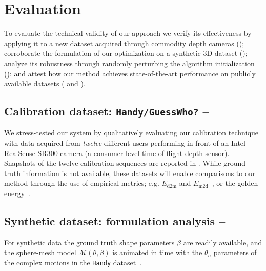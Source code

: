 \section{Evaluation}
To evaluate the technical validity of our approach we verify its effectiveness by applying it to a new dataset acquired through commodity depth cameras (); corroborate the formulation of our optimization on a synthetic 3D dataset (); analyze its robustness through randomly perturbing the algorithm initialization (); and attest how our method achieves state-of-the-art performance on publicly available datasets ( and ).

\subsection{Calibration dataset: \texttt{Handy/GuessWho?} -- }
\label{sec:evaldataset}
We stress-tested our system by qualitatively evaluating our calibration technique with data acquired from \emph{twelve} different users performing in front of an Intel RealSense SR300 camera (a consumer-level time-of-flight depth sensor). Snapshots of the twelve calibration sequences are reported in .
While ground truth information is not available, these datasets will enable comparisons to our method through the use of empirical metrics; e.g. $E_\text{d2m}$ and $E_\text{m2d}$~\cite{tkach2016sphere}, or the golden-energy~\cite{taylor2016joint}.

\subsection{Synthetic dataset: formulation analysis -- }
\label{sec:analysis}
For synthetic data the ground truth shape parameters $\bar\beta$ are readily available, and the sphere-mesh model $\mathcal{M}(\theta,\beta)$ is animated in time with the $\bar\theta_n$ parameters of the complex motions in the \texttt{Handy} dataset~\cite{tkach2016sphere}.

